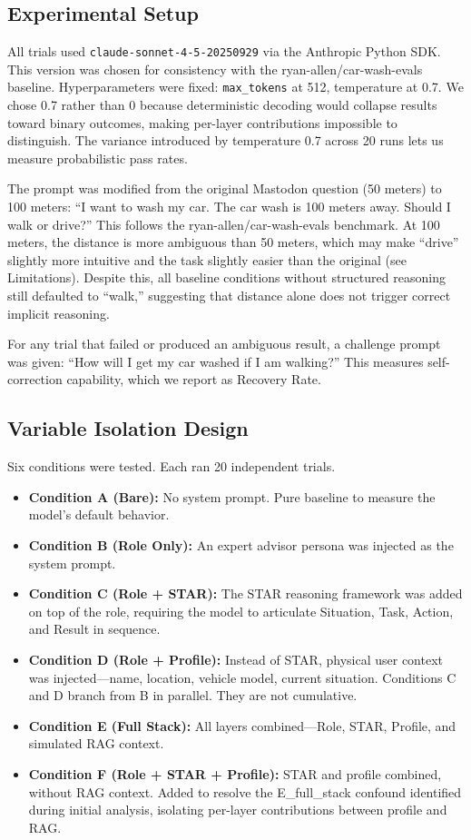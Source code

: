 \documentclass[11pt]{article}
\begin{document}
\subsection{Experimental Setup}

All trials used \texttt{claude-sonnet-4-5-20250929} via the Anthropic Python SDK. This version was chosen for consistency with the ryan-allen/car-wash-evals baseline. Hyperparameters were fixed: \texttt{max\_tokens} at 512, temperature at 0.7. We chose 0.7 rather than 0 because deterministic decoding would collapse results toward binary outcomes, making per-layer contributions impossible to distinguish. The variance introduced by temperature 0.7 across 20 runs lets us measure probabilistic pass rates.

The prompt was modified from the original Mastodon question (50 meters) to 100 meters: ``I want to wash my car. The car wash is 100 meters away. Should I walk or drive?'' This follows the ryan-allen/car-wash-evals benchmark. At 100 meters, the distance is more ambiguous than 50 meters, which may make ``drive'' slightly more intuitive and the task slightly easier than the original (see Limitations). Despite this, all baseline conditions without structured reasoning still defaulted to ``walk,'' suggesting that distance alone does not trigger correct implicit reasoning.

For any trial that failed or produced an ambiguous result, a challenge prompt was given: ``How will I get my car washed if I am walking?'' This measures self-correction capability, which we report as Recovery Rate.

\subsection{Variable Isolation Design}

Six conditions were tested. Each ran 20 independent trials.

\begin{itemize}[leftmargin=2em]
\item \textbf{Condition A (Bare):} No system prompt. Pure baseline to measure the model's default behavior.
\item \textbf{Condition B (Role Only):} An expert advisor persona was injected as the system prompt.
\item \textbf{Condition C (Role + STAR):} The STAR reasoning framework was added on top of the role, requiring the model to articulate Situation, Task, Action, and Result in sequence.
\item \textbf{Condition D (Role + Profile):} Instead of STAR, physical user context was injected---name, location, vehicle model, current situation. Conditions C and D branch from B in parallel. They are not cumulative.
\item \textbf{Condition E (Full Stack):} All layers combined---Role, STAR, Profile, and simulated RAG context.
\item \textbf{Condition F (Role + STAR + Profile):} STAR and profile combined, without RAG context. Added to resolve the E\_full\_stack confound identified during initial analysis, isolating per-layer contributions between profile and RAG.
\end{itemize}
\end{document}
